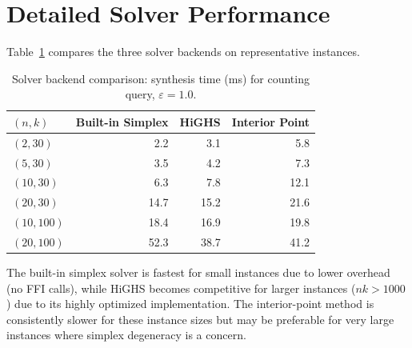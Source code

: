 \documentclass[11pt,a4paper]{article}
\newcommand{\eps}{\varepsilon}
\begin{document}
\section{Detailed Solver Performance}
\label{app:solver}

Table~\ref{tab:solver_detail} compares the three solver backends on representative
instances.

\begin{table}[h]
\centering
\caption{Solver backend comparison: synthesis time (ms) for counting query, $\eps = 1.0$.}
\label{tab:solver_detail}
\begin{tabular}{@{}lrrr@{}}
\toprule
$(n, k)$ & Built-in Simplex & HiGHS & Interior Point \\
\midrule
$(2, 30)$   & 2.2  & 3.1  & 5.8 \\
$(5, 30)$   & 3.5  & 4.2  & 7.3 \\
$(10, 30)$  & 6.3  & 7.8  & 12.1 \\
$(20, 30)$  & 14.7 & 15.2 & 21.6 \\
$(10, 100)$ & 18.4 & 16.9 & 19.8 \\
$(20, 100)$ & 52.3 & 38.7 & 41.2 \\
\bottomrule
\end{tabular}
\end{table}

The built-in simplex solver is fastest for small instances due to lower overhead
(no FFI calls), while HiGHS becomes competitive for larger instances ($nk > 1000$)
due to its highly optimized implementation.  The interior-point method is
consistently slower for these instance sizes but may be preferable for very large
instances where simplex degeneracy is a concern.
\end{document}
